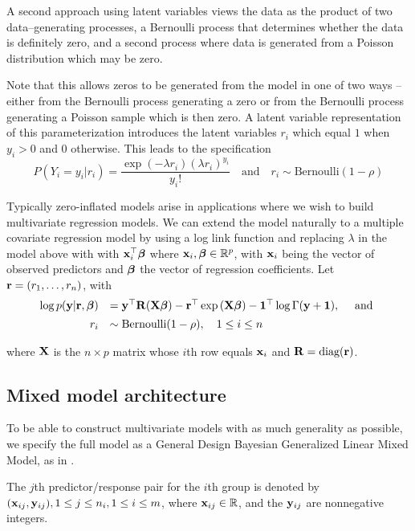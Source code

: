 \documentclass{amsart}[12pt]
\begin{document}
A second approach using latent variables views the data as the product of two data--generating processes, a
Bernoulli process that determines whether the data is definitely zero, and a second process where data is
generated from a Poisson distribution which may be zero.

Note that this allows zeros to be generated from the model in one of two ways -- either from the Bernoulli
process generating a zero or from the Bernoulli process generating a Poisson sample which is then zero.
A latent variable representation of this parameterization introduces the latent variables $r_i$ which
equal $1$ when $y_i>0$ and $0$ otherwise. This leads to the specification
\[
	P(Y_i=y_i|r_i) = \frac{\exp(-\lambda r_i)(\lambda r_i)^{y_i}}{y_i!} \quad \mbox{and} \quad r_i \sim \mbox{Bernoulli}(1-\rho)
\]

Typically zero-inflated models arise in applications where we wish to build multivariate regression models. 
We can extend the model naturally to a multiple covariate regression model by using a log link function and
replacing $\lambda$ in the model above with with ${\bf x}_i^\top {\boldsymbol\beta}$ where ${\bf x}_i,{\boldsymbol \beta} \in {\mathbb{R}}^p$, with
${\bf x}_i$ being the vector of observed predictors and ${\boldsymbol \beta}$ the vector of regression coefficients. Let ${\bf r} =
(r_1,\ldots,r_n)$, with
\[%
	\begin{array}{rl}
		\log p(\vy|\vr, \vbeta) 
		    & = \vy^\top \mR (\mX\vbeta)                           
		- \vr^\top \exp{(\mX\vbeta)} 
		- \vone^\top \log{\Gamma{(\vy + \vone)}}, \quad \mbox{ and }\\ [1ex]
		r_i & \sim \text{Bernoulli}(1-\rho), \quad 1 \leq i \leq n \\
	\end{array}
\]

\noindent where ${\bf X}$ is the $n\times p$ matrix whose $i$th row equals ${\bf x}_i$ and ${\bf R} = \text{diag}{({\bf r})}$.

\subsection{Mixed model architecture}

To
be able to construct multivariate models with as much generality as possible, we specify the full model as a
General Design Bayesian Generalized Linear Mixed Model, as in \citep{Zhao2006}.

The $j$th predictor/response pair for the $i$th group is denoted by $({\bf x}_{ij}, {\bf y}_{ij}), 1 \leq j \leq n_i, 1 \leq i \leq m$, where ${\bf x}_{ij} \in {\mathbb{R}}$, and the ${\bf y}_{ij}$ are nonnegative integers.
\end{document}
